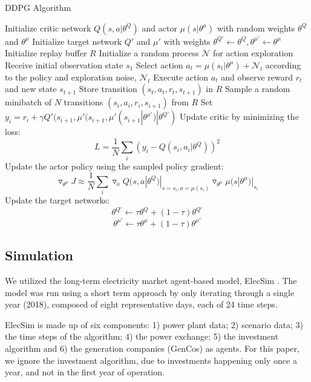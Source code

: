 \documentclass[conference]{IEEEtran}
\begin{document}
\begin{algorithm}
\caption{DDPG Algorithm \cite{Hunt2016a}}
\begin{algorithmic}[1]
  \footnotesize
  \STATE Initialize critic network $Q(s,a|\theta^Q)$ and actor $\mu(s|\theta^\mu)$ with random weights $\theta^Q$ and $\theta^\mu$
  \STATE Initialize target network $Q'$ and $\mu'$ with weights $\theta^{Q'}\leftarrow\theta^Q,\theta^{\mu'}\leftarrow \theta^{\mu}$
  \STATE Initialize replay buffer $R$
        \STATE Initialize a random process $\mathcal{N}$ for action exploration
        \STATE Receive initial observation state $s_1$
        	\STATE Select action $a_t=\mu(s_t|\theta^{\mu})+\mathcal{N}_t$ according to the policy and exploration noise, $\mathcal{N}_t$
        	\STATE Execute action $a_t$ and observe reward $r_t$ and new state $s_{t+1}$
        	\STATE Store transition $(s_t, a_t, r_t, s_{t+1})$ in $R$
        	\STATE Sample a random minibatch of $N$ transitions $(s_i, a_i, r_i, s_{i+1})$ from $R$
        	\STATE Set $y_i=r_i+\gamma Q'(s_{i+1},\mu'(s_{i+1},\mu'(s_{i+1}|\theta^{\mu'})|\theta^{Q'})$
        	\STATE Update critic by minimizing the loss: $$L=\frac{1}{N}\sum_i(y_i-Q(s_i,a_i|\theta^Q))^2$$
        	\STATE Update the actor policy using the sampled policy gradient: $$\triangledown_{\theta^\mu}J\approx \frac{1}{N}\sum_i\triangledown_a Q(s,a|\theta^Q)|_{s=s_i,a=\mu(s_i)}\triangledown_{\theta^\mu}\mu(s|\theta^\mu)|_{s_i}$$
        	\STATE Update the target networks:
        	$$\theta^{Q'}\leftarrow\tau\theta^Q+(1-\tau)\theta^{Q'}$$
        	$$\theta^{\mu'}\leftarrow\tau\theta^\mu+(1-\tau)\theta^{\mu'}$$
        \ENDFOR
      \ENDFOR
\end{algorithmic}
\end{algorithm}

\subsection{Simulation}

We utilized the long-term electricity market agent-based model, ElecSim \cite{Kell,Kell2020b}. The model was run using a short term approach by only iterating through a single year (2018), composed of eight representative days, each of 24 time steps.

ElecSim is made up of six components: 1) power plant data; 2) scenario data; 3) the time steps of the algorithm; 4) the power exchange; 5) the investment algorithm and 6) the generation companies (GenCos) as agents. For this paper, we ignore the investment algorithm, due to investments happening only once a year, and not in the first year of operation. 
\end{document}
